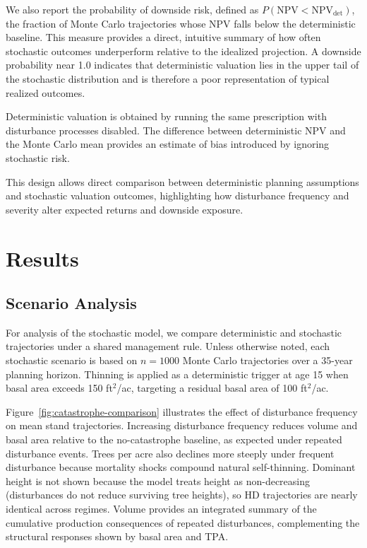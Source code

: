 \documentclass[12pt]{report}
\begin{document}
We also report the probability of downside risk, defined as $P(\mathrm{NPV} < \mathrm{NPV}_{\text{det}})$, the fraction of Monte Carlo trajectories whose NPV falls below the deterministic baseline. This measure provides a direct, intuitive summary of how often stochastic outcomes underperform relative to the idealized projection. A downside probability near 1.0 indicates that deterministic valuation lies in the upper tail of the stochastic distribution and is therefore a poor representation of typical realized outcomes.

Deterministic valuation is obtained by running the same prescription with disturbance processes disabled. The difference between deterministic NPV and the Monte Carlo mean provides an estimate of bias introduced by ignoring stochastic risk.

This design allows direct comparison between deterministic planning assumptions and stochastic valuation outcomes, highlighting how disturbance frequency and severity alter expected returns and downside exposure.


\chapter{Results}

\section{Scenario Analysis}

For analysis of the stochastic model, we compare deterministic and stochastic trajectories under a shared management rule. Unless otherwise noted, each stochastic scenario is based on $n=1000$ Monte Carlo trajectories over a 35-year planning horizon. Thinning is applied as a deterministic trigger at age 15 when basal area exceeds 150 ft$^2$/ac, targeting a residual basal area of 100 ft$^2$/ac.

Figure~\ref{fig:catastrophe-comparison} illustrates the effect of disturbance frequency on mean stand trajectories. Increasing disturbance frequency reduces volume and basal area relative to the no-catastrophe baseline, as expected under repeated disturbance events. Trees per acre also declines more steeply under frequent disturbance because mortality shocks compound natural self-thinning. Dominant height is not shown because the model treats height as non-decreasing (disturbances do not reduce surviving tree heights), so HD trajectories are nearly identical across regimes. Volume provides an integrated summary of the cumulative production consequences of repeated disturbances, complementing the structural responses shown by basal area and TPA.
\end{document}
